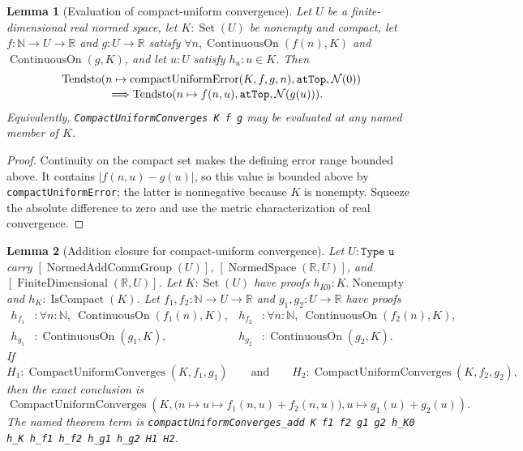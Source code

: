 \documentclass[9pt]{extarticle}
\newtheorem{lemma}{Lemma}[section]
\theoremstyle{definition}
\theoremstyle{remark}
\newcommand{\R}{\mathbb R}
\newcommand{\N}{\mathbb N}
\newcommand{\abs}[1]{\left\lvert #1\right\rvert}
\begin{document}
\begin{lemma}[Evaluation of compact-uniform convergence]
\label{lem:compact-uniform-eval}
Let $U$ be a finite-dimensional real normed space, let
$K:\operatorname{Set}(U)$ be nonempty and compact, let
$f:\N\to U\to\R$ and $g:U\to\R$ satisfy
$\forall n,\operatorname{ContinuousOn}(f(n),K)$ and
$\operatorname{ContinuousOn}(g,K)$, and let $u:U$ satisfy $h_u:u\in K$.
Then
\begin{align*}
&\operatorname{Tendsto}
 (n\mapsto\operatorname{compactUniformError}(K,f,g,n),
  \texttt{atTop},\mathcal N(0))\\[-2pt]
&\hspace{15mm}\Longrightarrow
 \operatorname{Tendsto}(n\mapsto f(n,u),
  \texttt{atTop},\mathcal N(g(u))).
\end{align*}
Equivalently, \texttt{CompactUniformConverges K f g} may be evaluated at
any named member of $K$.
\end{lemma}

\begin{proof}
Continuity on the compact set makes the defining error range bounded above.
It contains $\abs{f(n,u)-g(u)}$, so this value is bounded above by
\texttt{compactUniformError}; the latter is nonnegative because $K$ is
nonempty.  Squeeze the absolute difference to zero and use the metric
characterization of real convergence.
\end{proof}

\begin{lemma}[Addition closure for compact-uniform convergence]
\label{lem:compact-uniform-add}
Let $U:\texttt{Type u}$ carry
$[\operatorname{NormedAddCommGroup}(U)]$,
$[\operatorname{NormedSpace}(\R,U)]$, and
$[\operatorname{FiniteDimensional}(\R,U)]$.  Let
$K:\operatorname{Set}(U)$ have proofs $h_{K0}:K.\operatorname{Nonempty}$
and $h_K:\operatorname{IsCompact}(K)$.  Let
$f_1,f_2:\N\to U\to\R$ and $g_1,g_2:U\to\R$ have proofs
\begin{align*}
h_{f_1}&:\forall n:\N,\ \operatorname{ContinuousOn}(f_1(n),K),&
h_{f_2}&:\forall n:\N,\ \operatorname{ContinuousOn}(f_2(n),K),\\
h_{g_1}&:\operatorname{ContinuousOn}(g_1,K),&
h_{g_2}&:\operatorname{ContinuousOn}(g_2,K).
\end{align*}
If
\[
 H_1:\operatorname{CompactUniformConverges}(K,f_1,g_1)
 \qquad\text{and}\qquad
 H_2:\operatorname{CompactUniformConverges}(K,f_2,g_2),
\]
then the exact conclusion is
\[
 \operatorname{CompactUniformConverges}\!\left(
 K,\bigl(n\mapsto u\mapsto f_1(n,u)+f_2(n,u)\bigr),
   u\mapsto g_1(u)+g_2(u)\right).
\]
The named theorem term is
\texttt{compactUniformConverges\_add
 K f1 f2 g1 g2 h\_K0 h\_K h\_f1 h\_f2 h\_g1 h\_g2 H1 H2}.
\end{lemma}
\end{document}
